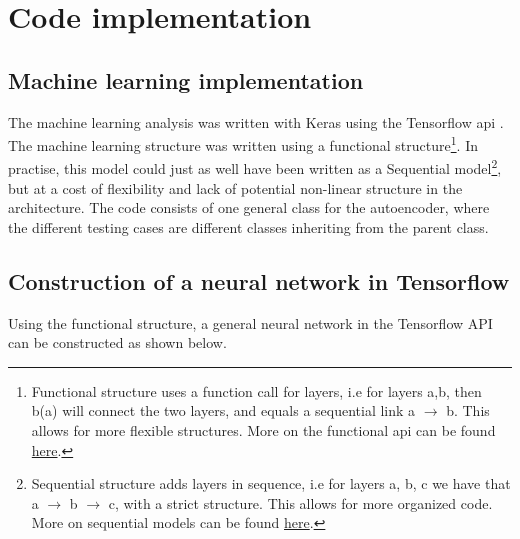 \newpage
\section{Code implementation}
\subsection*{Machine learning implementation}

The machine learning analysis was written with Keras\cite{chollet2015keras} using the Tensorflow api\cite{tensorflow2015-whitepaper} . 
The machine learning structure was written using a functional structure\footnote{Functional structure uses a function call for layers, i.e for layers a,b, then b(a) will connect the two layers, and equals a sequential link a $\to$ b. This allows for more flexible structures. More on the functional api can be found \href{https://www.tensorflow.org/guide/keras/functional}{here}.}.
In practise, this model could just as well have been written as a Sequential model\footnote{Sequential structure adds layers in sequence, i.e for layers a, b, c we have that a $\to$ b $\to$ c, with a strict structure. This allows for more organized code. More on sequential models can be found \href{https://www.tensorflow.org/guide/keras/sequential_model}{here}.}, 
but at a cost of flexibility and lack of potential non-linear structure in the architecture. The code consists of one general class for
 the autoencoder, where the different testing cases are different classes inheriting from the parent class.\par



\subsection*{Construction of a neural network in Tensorflow}

Using the functional structure, a general neural network in the Tensorflow API can be constructed as shown below. 

